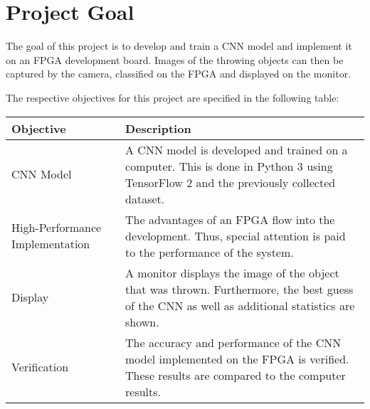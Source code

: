 \chapter{Project Goal}
\label{ch:project_goal}

The goal of this project is to develop and train a CNN model and implement it on an FPGA development board.
Images of the throwing objects can then be captured by the camera, classified on the FPGA and displayed on the monitor.

The respective objectives for this project are specified in the following table:\\

\begin{tabularx}{\textwidth}{L{3.05cm}X}
  \toprule
  \textbf{Objective} & \textbf{Description} \\
  \midrule
  CNN Model & A CNN model is developed and trained on a computer. This is done in Python 3 using TensorFlow 2 and the previously collected dataset. \\
  \midrule
  High-Performance Implementation & The advantages of an FPGA flow into the development. Thus, special attention is paid to the performance of the system. \\
  \midrule
  Display & A monitor displays the image of the object that was thrown. Furthermore, the best guess of the CNN as well as additional statistics are shown. \\
  \midrule
  Verification & The accuracy and performance of the CNN model implemented on the FPGA is verified. These results are compared to the computer results. \\
  \bottomrule
\end{tabularx}
